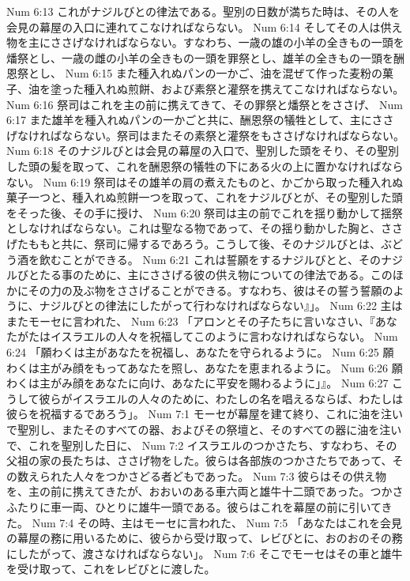 Num 6:13  これがナジルびとの律法である。聖別の日数が満ちた時は、その人を会見の幕屋の入口に連れてこなければならない。
Num 6:14  そしてその人は供え物を主にささげなければならない。すなわち、一歳の雄の小羊の全きもの一頭を燔祭とし、一歳の雌の小羊の全きもの一頭を罪祭とし、雄羊の全きもの一頭を酬恩祭とし、
Num 6:15  また種入れぬパンの一かご、油を混ぜて作った麦粉の菓子、油を塗った種入れぬ煎餅、および素祭と灌祭を携えてこなければならない。
Num 6:16  祭司はこれを主の前に携えてきて、その罪祭と燔祭とをささげ、
Num 6:17  また雄羊を種入れぬパンの一かごと共に、酬恩祭の犠牲として、主にささげなければならない。祭司はまたその素祭と灌祭をもささげなければならない。
Num 6:18  そのナジルびとは会見の幕屋の入口で、聖別した頭をそり、その聖別した頭の髪を取って、これを酬恩祭の犠牲の下にある火の上に置かなければならない。
Num 6:19  祭司はその雄羊の肩の煮えたものと、かごから取った種入れぬ菓子一つと、種入れぬ煎餅一つを取って、これをナジルびとが、その聖別した頭をそった後、その手に授け、
Num 6:20  祭司は主の前でこれを揺り動かして揺祭としなければならない。これは聖なる物であって、その揺り動かした胸と、ささげたももと共に、祭司に帰するであろう。こうして後、そのナジルびとは、ぶどう酒を飲むことができる。
Num 6:21  これは誓願をするナジルびとと、そのナジルびとたる事のために、主にささげる彼の供え物についての律法である。このほかにその力の及ぶ物をささげることができる。すなわち、彼はその誓う誓願のように、ナジルびとの律法にしたがって行わなければならない』」。
Num 6:22  主はまたモーセに言われた、
Num 6:23  「アロンとその子たちに言いなさい、『あなたがたはイスラエルの人々を祝福してこのように言わなければならない。
Num 6:24  「願わくは主があなたを祝福し、あなたを守られるように。
Num 6:25  願わくは主がみ顔をもってあなたを照し、あなたを恵まれるように。
Num 6:26  願わくは主がみ顔をあなたに向け、あなたに平安を賜わるように」』。
Num 6:27  こうして彼らがイスラエルの人々のために、わたしの名を唱えるならば、わたしは彼らを祝福するであろう」。
Num 7:1  モーセが幕屋を建て終り、これに油を注いで聖別し、またそのすべての器、およびその祭壇と、そのすべての器に油を注いで、これを聖別した日に、
Num 7:2  イスラエルのつかさたち、すなわち、その父祖の家の長たちは、ささげ物をした。彼らは各部族のつかさたちであって、その数えられた人々をつかさどる者どもであった。
Num 7:3  彼らはその供え物を、主の前に携えてきたが、おおいのある車六両と雄牛十二頭であった。つかさふたりに車一両、ひとりに雄牛一頭である。彼らはこれを幕屋の前に引いてきた。
Num 7:4  その時、主はモーセに言われた、
Num 7:5  「あなたはこれを会見の幕屋の務に用いるために、彼らから受け取って、レビびとに、おのおのその務にしたがって、渡さなければならない」。
Num 7:6  そこでモーセはその車と雄牛を受け取って、これをレビびとに渡した。

